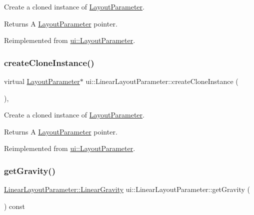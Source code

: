 Create a cloned instance of \hyperlink{classui_1_1LayoutParameter}{Layout\+Parameter}. \begin{DoxyReturn}{Returns}
A \hyperlink{classui_1_1LayoutParameter}{Layout\+Parameter} pointer. 
\end{DoxyReturn}


Reimplemented from \hyperlink{classui_1_1LayoutParameter_a6ca908e0dd4f85238894b28d5d816974}{ui\+::\+Layout\+Parameter}.

\mbox{\label{classui_1_1LinearLayoutParameter_a90adfb888afd28d7ee8974f5a32afe35}} 
\subsubsection{\texorpdfstring{create\+Clone\+Instance()}{createCloneInstance()}\hspace{0.1cm}{\footnotesize\ttfamily [2/2]}}
{\footnotesize\ttfamily virtual \hyperlink{classui_1_1LayoutParameter}{Layout\+Parameter}$\ast$ ui\+::\+Linear\+Layout\+Parameter\+::create\+Clone\+Instance (\begin{DoxyParamCaption}{ }\end{DoxyParamCaption})\hspace{0.3cm}{\ttfamily [override]}, {\ttfamily [virtual]}}

Create a cloned instance of \hyperlink{classui_1_1LayoutParameter}{Layout\+Parameter}. \begin{DoxyReturn}{Returns}
A \hyperlink{classui_1_1LayoutParameter}{Layout\+Parameter} pointer. 
\end{DoxyReturn}


Reimplemented from \hyperlink{classui_1_1LayoutParameter_a6ca908e0dd4f85238894b28d5d816974}{ui\+::\+Layout\+Parameter}.

\mbox{\label{classui_1_1LinearLayoutParameter_a5950d061c67834f27b76fe3eb272451a}} 
\subsubsection{\texorpdfstring{get\+Gravity()}{getGravity()}\hspace{0.1cm}{\footnotesize\ttfamily [1/2]}}
{\footnotesize\ttfamily \hyperlink{classui_1_1LinearLayoutParameter_a2045fd6c06860357e95bccdf2531fe08}{Linear\+Layout\+Parameter\+::\+Linear\+Gravity} ui\+::\+Linear\+Layout\+Parameter\+::get\+Gravity (\begin{DoxyParamCaption}{ }\end{DoxyParamCaption}) const}

